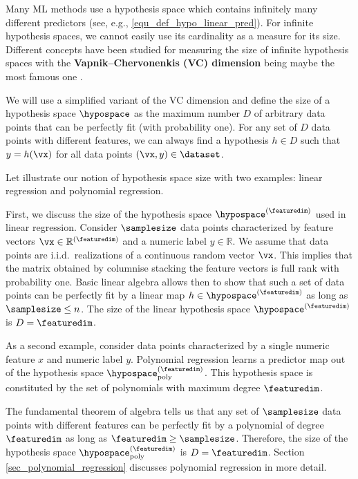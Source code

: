 \documentclass[12pt]{report}
\newcommand{\sizehypospace}{D}
\begin{document}
Many ML methods use a hypothesis space which contains infinitely many 
different predictors (see, e.g., \eqref{equ_def_hypo_linear_pred}). 
For infinite hypothesis spaces, we cannot easily use its cardinality as 
a measure for its size. Different concepts have been studied for 
measuring the size of infinite hypothesis spaces with the 
{\bf Vapnik–Chervonenkis (VC) dimension} being maybe the 
most famous one \cite{VapnikBook}. 

We will use a simplified variant of the VC dimension and define the 
size of a hypothesis space $\hypospace$ as the maximum number 
$\sizehypospace$ of arbitrary data points that can be perfectly fit 
(with probability one). For any set of $\sizehypospace$ data points 
with different features, we can always find a hypothesis $h \in \sizehypospace$ 
such that $y=h(\vx)$ for all data points $(\vx,y) \in \dataset$. 

Let illustrate our notion of hypothesis space size with two examples: 
linear regression and polynomial regression. 

First, we discuss the size of the hypothesis space $\hypospace^{(\featuredim)}$ 
used in linear regression. Consider $\samplesize$ data points characterized by feature 
vectors $\vx \in \mathbb{R}^{(\featuredim)}$ and a numeric label 
$y \in \mathbb{R}$. We assume that data points are i.i.d.\ realizations 
of a continuous random vector $\vx$. This implies that the matrix obtained by columnise stacking 
the feature vectors is full rank with probability one. Basic linear 
algebra allows then to show that such a set of data points can 
be perfectly fit by a linear map $h \in \hypospace^{(\featuredim)}$ 
as long as $\samplesize \leq n$. The size of the linear 
hypothesis space $\hypospace^{(\featuredim)}$ is $\sizehypospace = \featuredim$. 

As a second example, consider data points characterized 
by a single numeric feature $x$ and numeric label $y$. 
Polynomial regression learns a predictor map out of 
the hypothesis space $\hypospace_{\rm poly}^{(\featuredim)}$. 
This hypothesis space is constituted by the set of  
polynomials with maximum degree $\featuredim$. 

The fundamental theorem of algebra tells us that any set 
of $\samplesize$ data points with different features can 
be perfectly fit by a polynomial of degree $\featuredim$ 
as long as $\featuredim \geq \samplesize$. Therefore, the 
size of the hypothesis space $\hypospace_{\rm poly}^{(\featuredim)}$ 
is $\sizehypospace=\featuredim$. Section \ref{sec_polynomial_regression} 
discusses polynomial regression in more detail. 
\end{document}
